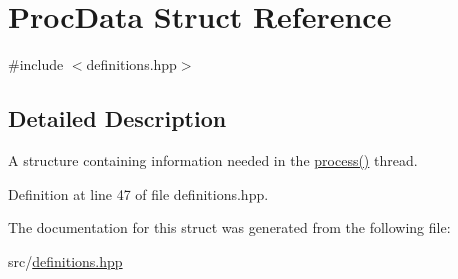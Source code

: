 \hypertarget{structProcData}{\section{Proc\+Data Struct Reference}
\label{structProcData}
}


{\ttfamily \#include $<$definitions.\+hpp$>$}



\subsection{Detailed Description}
A structure containing information needed in the \hyperlink{namespacevaso_a0579351ab19fb51460f6e9c50f234e22}{process()} thread. 

Definition at line 47 of file definitions.\+hpp.



The documentation for this struct was generated from the following file\+:\begin{DoxyCompactItemize}
\item 
src/\hyperlink{definitions_8hpp}{definitions.\+hpp}\end{DoxyCompactItemize}
